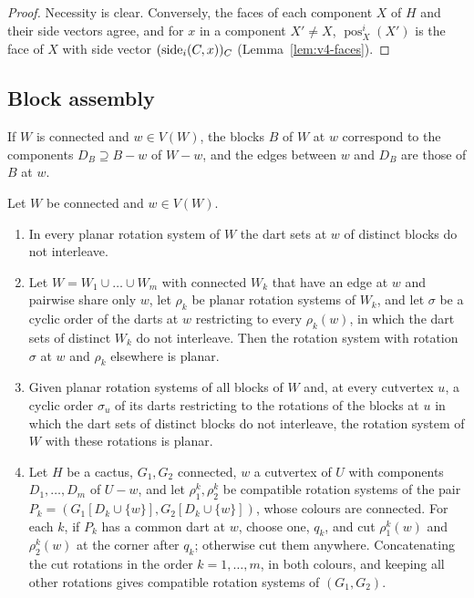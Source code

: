 \begin{proof}
Necessity is clear. Conversely, the faces of each component $X$ of $H$ and
their side vectors agree, and for $x$ in a component $X'\neq X$,
$\operatorname{pos}^i_X(X')$ is the face of $X$ with side vector
$(\operatorname{side}_i(C,x))_C$ (Lemma~\ref{lem:v4-faces}).
\end{proof}

\subsection{Block assembly}\label{sec:v4-assembly}

If $W$ is connected and $w\in V(W)$, the blocks $B$ of $W$ at $w$ correspond
to the components $D_B\supseteq B-w$ of $W-w$, and the edges between $w$ and
$D_B$ are those of $B$ at $w$.

\begin{lemma}[assembly]\label{lem:v4-assembly}
Let $W$ be connected and $w\in V(W)$.
\begin{enumerate}[label=(\alph*),nosep]
\item In every planar rotation system of $W$ the dart sets at $w$ of
distinct blocks do not interleave.
\item Let $W=W_1\cup\dots\cup W_m$ with connected $W_k$ that have an edge at
$w$ and pairwise share only $w$, let $\rho_k$ be planar rotation systems of
$W_k$, and let $\sigma$ be a cyclic order of the darts at $w$ restricting to
every $\rho_k(w)$, in which the dart sets of distinct $W_k$ do not
interleave. Then the rotation system with rotation $\sigma$ at $w$ and
$\rho_k$ elsewhere is planar.
\item Given planar rotation systems of all blocks of $W$ and, at every
cutvertex $u$, a cyclic order $\sigma_u$ of its darts restricting to the
rotations of the blocks at $u$ in which the dart sets of distinct blocks do
not interleave, the rotation system of $W$ with these rotations is planar.
\item Let $H$ be a cactus, $G_1,G_2$ connected, $w$ a cutvertex of $U$ with
components $D_1,\dots,D_m$ of $U-w$, and let $\rho^k_1,\rho^k_2$ be
compatible rotation systems of the pair $P_k=(G_1[D_k\cup\{w\}],
G_2[D_k\cup\{w\}])$, whose colours are connected. For each $k$, if $P_k$
has a common dart at $w$, choose one, $q_k$, and cut $\rho^k_1(w)$ and
$\rho^k_2(w)$ at the corner after $q_k$; otherwise cut them anywhere.
Concatenating the cut rotations in the order $k=1,\dots,m$, in both colours,
and keeping all other rotations gives compatible rotation systems of
$(G_1,G_2)$.
\end{enumerate}
\end{lemma}

